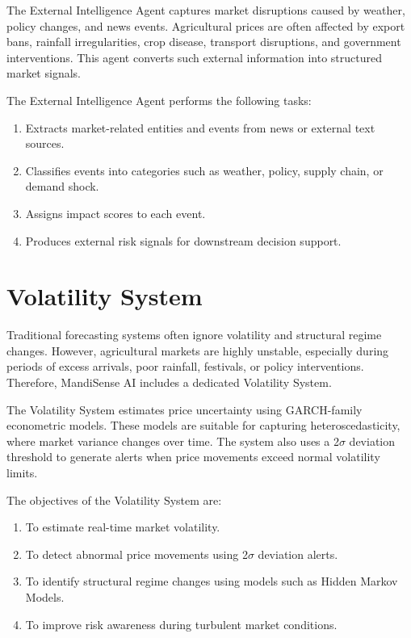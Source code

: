 \documentclass[12pt,a4paper]{report}
\begin{document}
The External Intelligence Agent captures market disruptions caused by weather, policy changes, and news events. Agricultural prices are often affected by export bans, rainfall irregularities, crop disease, transport disruptions, and government interventions. This agent converts such external information into structured market signals.

The External Intelligence Agent performs the following tasks:

\begin{enumerate}
    \item Extracts market-related entities and events from news or external text sources.
    \item Classifies events into categories such as weather, policy, supply chain, or demand shock.
    \item Assigns impact scores to each event.
    \item Produces external risk signals for downstream decision support.
\end{enumerate}

\section{Volatility System}

Traditional forecasting systems often ignore volatility and structural regime changes. However, agricultural markets are highly unstable, especially during periods of excess arrivals, poor rainfall, festivals, or policy interventions. Therefore, MandiSense AI includes a dedicated Volatility System.

The Volatility System estimates price uncertainty using GARCH-family econometric models. These models are suitable for capturing heteroscedasticity, where market variance changes over time. The system also uses a 2$\sigma$ deviation threshold to generate alerts when price movements exceed normal volatility limits.

The objectives of the Volatility System are:

\begin{enumerate}
    \item To estimate real-time market volatility.
    \item To detect abnormal price movements using 2$\sigma$ deviation alerts.
    \item To identify structural regime changes using models such as Hidden Markov Models.
    \item To improve risk awareness during turbulent market conditions.
\end{enumerate}
\end{document}
